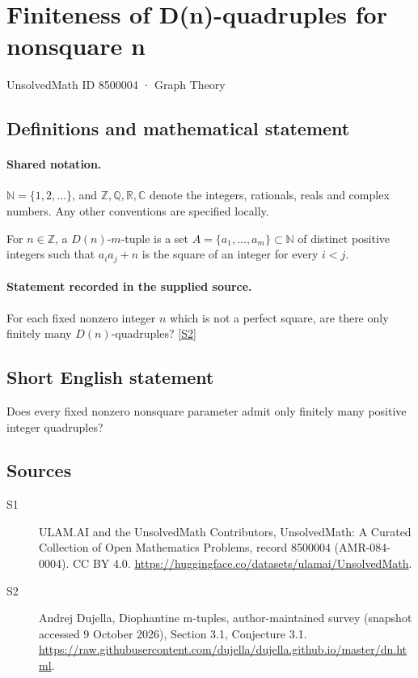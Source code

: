 \documentclass[11pt]{article}
\newcommand{\sref}[2]{\hyperlink{source:#1:#2}{[S#2]}}
\begin{document}
\setcounter{section}{8500003}
\section{Finiteness of D(n)-quadruples for nonsquare n}\label{8500004}
{\small\sffamily UnsolvedMath ID 8500004 · Graph Theory}
\subsection{Definitions and mathematical statement}

\paragraph{Shared notation.}$\mathbb N=\{1,2,\ldots\}$, and $\mathbb Z,\mathbb Q,\mathbb R,\mathbb C$ denote the integers, rationals, reals and complex numbers. Any other conventions are specified locally.


For $n\in\mathbb Z$, a $D(n)$-$m$-tuple is a set $A=\{a_1,\ldots,a_m\}\subset\mathbb N$ of distinct positive integers such that $a_i a_j+n$ is the square of an integer for every $i<j$.
\paragraph{Statement recorded in the supplied source.}
For each fixed nonzero integer $n$ which is not a perfect square, are there only finitely many $D(n)$-quadruples? \sref{8500004}{2}
\subsection{Short English statement}
Does every fixed nonzero nonsquare parameter admit only finitely many positive integer quadruples?
\subsection{Sources}
\begin{description}
\item[\hypertarget{source:8500004:1}{S1}] ULAM.AI and the UnsolvedMath Contributors, UnsolvedMath: A Curated Collection of Open Mathematics Problems, record 8500004 (AMR-084-0004). CC BY 4.0. \url{https://huggingface.co/datasets/ulamai/UnsolvedMath}.
\item[\hypertarget{source:8500004:2}{S2}] Andrej Dujella, Diophantine m-tuples, author-maintained survey (snapshot accessed 9 October 2026), Section 3.1, Conjecture 3.1. \url{https://raw.githubusercontent.com/dujella/dujella.github.io/master/dn.html}.
\end{description}
\label{end:8500004}
\end{document}
